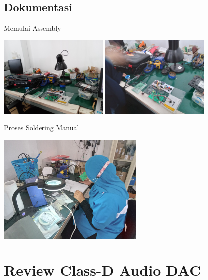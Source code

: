 \documentclass[table,dvipsnames]{beamer}
\begin{document}
	
	\begin{frame}
		\subsection{Dokumentasi}
		\begin{exampleblock}{Memulai Assembly}
			\begin{center}
				\includegraphics[width=150pt]{images/assembly_unpack}
				\includegraphics[width=150pt]{images/assembly_start}
			\end{center}
		\end{exampleblock}
	\end{frame}

	\begin{frame}
		\begin{exampleblock}{Proses Soldering Manual}
			\begin{center}
				\includegraphics[width=200pt]{images/assembly_manual}
			\end{center}
		\end{exampleblock}
	\end{frame}

	\section{Review Class-D Audio DAC}
	
\end{document}
